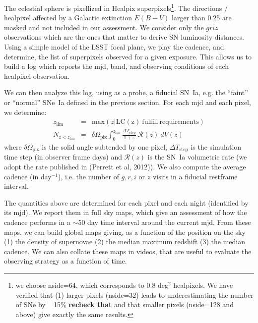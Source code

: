 \documentclass [11pt,a4paper]{article}
\newcommand{\FixMe}[1]{{\color{red} \bf \large #1}}
\begin{document}
The celestial sphere is pixellized in Healpix superpixels\footnote{we
  choose nside=64, which corresponds to 0.8 deg$^2$ healpixels.  We
  have verified that (1) larger pixels (nside=32) leads to
  underestimating the number of SNe by ~ 15\% \FixMe{recheck that} and
  that smaller pixels (nside=128 and above) give exactly the same
  results.}.  The directions / healpixel affected by a Galactic extinction $E(B-V)$ larger than 0.25
are masked and not included in our assessment. We consider only the $griz$ observations which are the ones
that matter to derive SN luminosity distances. 
Using a simple model of the LSST focal plane, we play
the cadence, and determine, the list of superpixels observed for a
given exposure. This allows us to build a log which reports the mjd,
band, and observing conditions of each healpixel observation.

We can then analyze this log, using as a probe, a fiducial SN~Ia,
e.g. the ``faint'' or ``normal'' SNe~Ia defined in the previous
section. For each mjd and each pixel, we determine:
\begin{eqnarray}
  z_{\mathrm{lim}} & = & \mathrm{max}\left(z | \mathrm{LC(z)\ fulfill\ requirements}\right) \\
  N_{z<z_{\mathrm{lim}}} &= & \delta\Omega_{\mathrm{pix}} \int_0^{z_\mathrm{lim}} \frac{\Delta T_{\mathrm{step}}}{1+z}\ {\mathcal{R}}(z)\ dV(z)
\end{eqnarray}
where $\delta\Omega_{\mathrm{pix}}$ is the solid angle subtended by
one pixel, $\Delta T_{\mathrm{step}}$ is the simulation time step (in
observer frame days) and $\mathcal{R}(z)$ is the SN~Ia volumetric rate
(we adopt the rate published in (Perrett et al, 2012)).  We also
compute the average cadence (in day$^{-1}$), i.e. the number of $g, r,
i$ or $z$ visits in a fiducial restframe interval.

The quantities above are determined for each pixel and each night
(identified by its mjd).  We report them in full sky maps, which give
an assessment of how the cadence performs in a $\sim 50$ day time
interval around the current mjd. From these maps, we can build global
maps giving, as a function of the position on the sky (1) the density
of supernovae (2) the median maximum redshift (3) the median cadence.
We can also collate these maps in videos, that are useful to evaluate
the observing strategy as a function of time.
\end{document}
